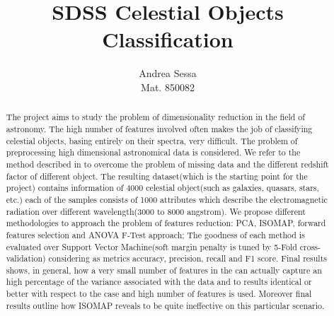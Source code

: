 \documentclass[a4paper,10pt]{article}
\title{SDSS Celestial Objects Classification}
\author{Andrea Sessa \\ \vspace{1cm} \small{Mat. 850082}}
\date{}
\begin{document}
\maketitle

\begin{abstract}
  The project aims to study the problem of dimensionality reduction in the field of astronomy.
  The high number of features involved often makes the job of classifying celestial objects, 
  basing entirely on their spectra, very difficult. The problem of preprocessing high dimensional 
  astronomical data is considered. We refer to the method described in \cite{redshift} to 
  overcome the problem of missing data and the different redshift factor of different object.
  The resulting dataset(which is the starting point for the project) contains information of
  4000 celestial object(such as galaxies, quasars, stars, etc.) each of the samples consists
  of 1000 attributes which describe the electromagnetic radiation over different wavelength(3000 to 8000 angstrom).
  We propose different methodologies to approach the problem of features reduction:
  PCA, ISOMAP, forward features selection and ANOVA F-Test approach;
  The goodness of each method is evaluated over Support Vector Machine(soft margin penalty is tuned by 5-Fold cross-validation)
  considering as metrics accuracy, precision, recall and F1 score.
  Final results shows, in general, how a very small number of features in the can actually capture an high percentage
  of the variance associated with the data and to results identical or better with respect to the case and high number
  of features is used. Moreover final results outline how ISOMAP reveals to be quite ineffective on this particular scenario.
\end{abstract}

\newpage

\tableofcontents

\newpage

\listoffigures

\newpage
\end{document}

